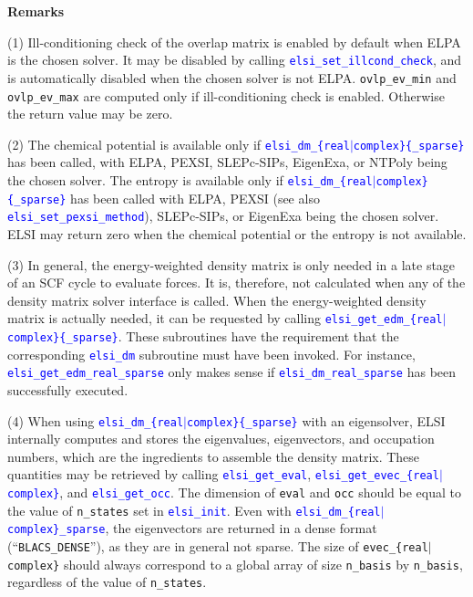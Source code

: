 \documentclass{report}
\newcommand{\api}[1]{\textcolor{blue}{\texttt{#1}}}
\begin{document}
\textbf{Remarks}

(1) Ill-conditioning check of the overlap matrix is enabled by default when ELPA is the chosen solver. It may be disabled by calling \api{elsi\_set\_illcond\_check}, and is automatically disabled when the chosen solver is not ELPA. \texttt{ovlp\_ev\_min} and \texttt{ovlp\_ev\_max} are computed only if ill-conditioning check is enabled. Otherwise the return value may be zero.

(2) The chemical potential is available only if \api{elsi\_dm\_\{real$\vert$complex\}\{\_sparse\}} has been called, with ELPA, PEXSI, SLEPc-SIPs, EigenExa, or NTPoly being the chosen solver. The entropy is available only if \api{elsi\_dm\_\{real$\vert$complex\}\{\_sparse\}} has been called with ELPA, PEXSI (see also \api{elsi\_set\_pexsi\_method}), SLEPc-SIPs, or EigenExa being the chosen solver. ELSI may return zero when the chemical potential or the entropy is not available.

(3) In general, the energy-weighted density matrix is only needed in a late stage of an SCF cycle to evaluate forces. It is, therefore, not calculated when any of the density matrix solver interface is called. When the energy-weighted density matrix is actually needed, it can be requested by calling \api{elsi\_get\_edm\_\{real$\vert$complex\}\{\_sparse\}}. These subroutines have the requirement that the corresponding \api{elsi\_dm} subroutine must have been invoked. For instance, \api{elsi\_get\_edm\_real\_sparse} only makes sense if \api{elsi\_dm\_real\_sparse} has been successfully executed.

(4) When using \api{elsi\_dm\_\{real$\vert$complex\}\{\_sparse\}} with an eigensolver, ELSI internally computes and stores the eigenvalues, eigenvectors, and occupation numbers, which are the ingredients to assemble the density matrix. These quantities may be retrieved by calling \api{elsi\_get\_eval}, \api{elsi\_get\_evec\_\{real$\vert$complex\}}, and \api{elsi\_get\_occ}. The dimension of \texttt{eval} and \texttt{occ} should be equal to the value of \texttt{n\_states} set in \api{elsi\_init}. Even with \api{elsi\_dm\_\{real$\vert$complex\}\_sparse}, the eigenvectors are returned in a dense format (``\texttt{BLACS\_DENSE}''), as they are in general not sparse. The size of \texttt{evec\_\{real$\vert$complex\}} should always correspond to a global array of size \texttt{n\_basis} by \texttt{n\_basis}, regardless of the value of \texttt{n\_states}.
\end{document}
